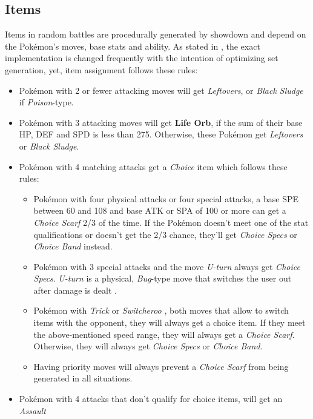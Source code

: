 \subsection{Items}
\label{sec:randbats-items}
Items in random battles are procedurally generated by showdown and depend on the Pokémon's
moves, base stats and ability. As stated in \cite{Smogon:RandBatsGuide}, the exact implementation
is \glqq changed frequently with the intention of optimizing set generation\grqq, yet, item
assignment follows these rules:
\begin{itemize}
	\item Pokémon with 2 or fewer attacking moves will get \textit{Leftovers}, or 
	\textit{Black Sludge} if \textit{Poison}-type.
	\item Pokémon with 3 attacking moves will get \textbf{Life Orb}, if the sum of their base
	\ac{HP}, \ac{DEF} and \ac{SPD} is less than 275. Otherwise, these Pokémon get 
	\textit{Leftovers} or \textit{Black Sludge}.
	\item Pokémon with 4 matching attacks get a \textit{Choice} item which follows these rules:
	\begin{itemize}
		\item Pokémon with four physical attacks or four special attacks, a base \ac{SPE} between
		60 and 108 and base \ac{ATK} or \ac{SPA} of 100 or more can get a \textit{Choice Scarf}
		2/3 of the time. If the Pokémon doesn't meet one of the stat qualifications or doesn't
		get the 2/3 chance, they'll get \textit{Choice Specs} or \textit{Choice Band} instead.
		\item Pokémon with 3 special attacks and the move \textit{U-turn} always get 
		\textit{Choice Specs}. \textit{U-turn} is a physical, \textit{Bug}-type move that 
		switches the user out after damage is dealt \cite{Bulbapedia:UTurn}.
		\item Pokémon with \textit{Trick} \cite{Bulbapedia:Trick} or \textit{Switcheroo} 
		\cite{Bulbapedia:Switcheroo}, both moves that allow to switch items
		with the opponent, they will always get a choice item. If they meet the above-mentioned 
		speed range, they will always get a \textit{Choice Scarf}. Otherwise, they will always
		get \textit{Choice Specs} or \textit{Choice Band}.
		\item Having priority moves will always prevent a \textit{Choice Scarf} from being 
		generated in all situations.
	\end{itemize}
	\item Pokémon with 4 attacks that don't qualify for choice items, will get an \textit{Assault
}
\end{itemize}
